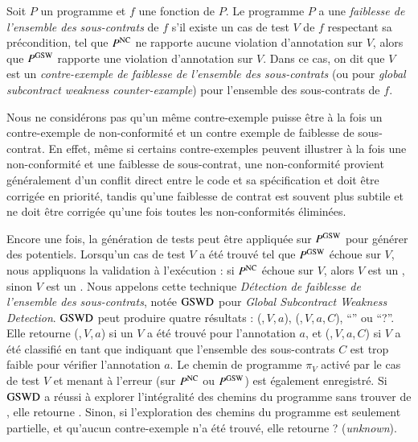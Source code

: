 \begin{definition} 
  \label{def:GSW}
  Soit $P$ un programme et $f$ une fonction de $P$.
  Le programme $P$ a une \emph{faiblesse de l'ensemble des sous-contrats} de $f$
  s'il existe un cas de test $V$ de $f$ respectant sa précondition, tel que
  $P^{\mathrm{NC}}$ ne rapporte aucune violation d'annotation sur $V$, alors que
  $P^{\mathrm{GSW}}$ rapporte une violation d'annotation sur $V$.
  Dans ce cas, on dit que $V$ est un
  \emph{contre-exemple de faiblesse de l'ensemble des sous-contrats} (ou \GSWCE
  pour {\em global subcontract weakness counter-example}) pour l'ensemble des
  sous-contrats de $f$.
\end{definition}

Nous ne considérons pas qu'un même contre-exemple puisse être à la fois un
contre-exemple de non-conformité et un contre exemple de faiblesse de
sous-contrat.
En effet, même si certains contre-exemples peuvent illustrer à la fois une
non-conformité et une faiblesse de sous-contrat, une non-conformité provient
généralement d'un conflit direct entre le code et sa spécification et doit être
corrigée en priorité, tandis qu'une faiblesse de contrat est souvent plus
subtile et ne doit être corrigée qu'une fois toutes les non-conformités
éliminées.

Encore une fois, la génération de tests peut être appliquée sur $P^{\mathrm{GSW}}$ pour
générer des \GSWCE potentiels.
Lorsqu'un cas de test $V$ a été trouvé tel que $P^{\mathrm{GSW}}$ échoue sur $V$, nous
appliquons la validation à l'exécution :
si $P^{\mathrm{NC}}$ échoue sur $V$, alors $V$ est un \NCCE, sinon $V$ est un \GSWCE.
Nous appelons cette technique
\emph{Détection de faiblesse de l'ensemble des sous-contrats}, notée $\mathrm{GSWD}$
pour \textit{Global Subcontract Weakness Detection}.
$\mathrm{GSWD}$ peut produire quatre résultats : (\nc,\,$V$,\,$a$),
(\cw,\,$V$,\,$a$,\,$C$), ``\no'' ou ``\textsf{?}''.
Elle retourne (\nc,\,$V$,\,$a$) si un \NCCE $V$ a été trouvé pour l'annotation
$a$, et (\cw,\,$V$,\,$a$,\,$C$) si $V$ a été classifié en tant que \GSWCE
indiquant que l'ensemble des sous-contrats $C$ est trop faible pour vérifier
l'annotation $a$.
Le chemin de programme $\pi_V$ activé par le cas de test $V$ et menant à
l'erreur (sur $P^{\mathrm{NC}}$ ou $P^{\mathrm{GSW}}$) est également enregistré.
Si $\mathrm{GSWD}$ a réussi à explorer l'intégralité des chemins du programme sans
trouver de \GSWCE, elle retourne \no.
Sinon, si l'exploration des chemins du programme est seulement partielle, et
qu'aucun contre-exemple n'a été trouvé, elle retourne \textsf{?}
({\em unknown}).


